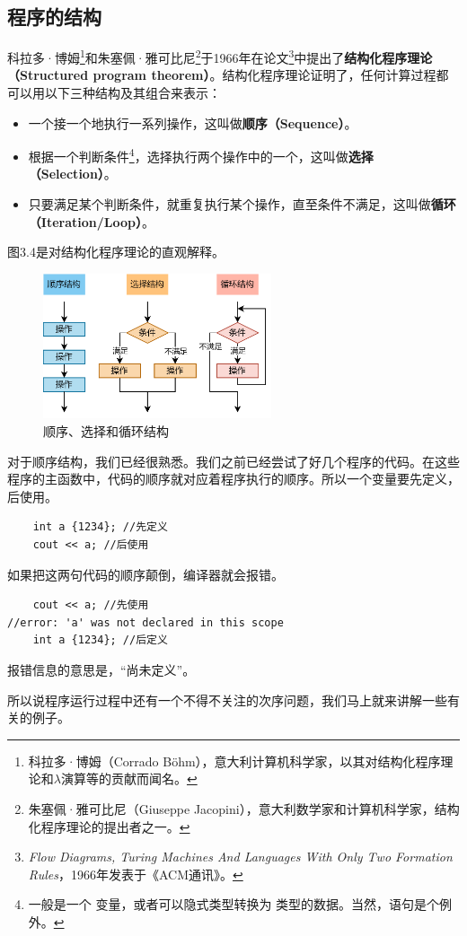 \subsection*{程序的结构}
科拉多·博姆\footnote{科拉多·博姆（Corrado Böhm），意大利计算机科学家，以其对结构化程序理论和$\!\lambda\!$演算等的贡献而闻名。}和朱塞佩·雅可比尼\footnote{朱塞佩·雅可比尼（Giuseppe Jacopini），意大利数学家和计算机科学家，结构化程序理论的提出者之一。}于1966年在论文\footnote{\textit{Flow Diagrams, Turing Machines And Languages With Only Two Formation Rules}，1966年发表于《ACM通讯》。}中提出了\textbf{结构化程序理论（Structured program theorem）}。结构化程序理论证明了，任何计算过程都可以用以下三种结构及其组合来表示：
\begin{itemize}
    \item 一个接一个地执行一系列操作，这叫做\textbf{顺序（Sequence）}。
    \item 根据一个判断条件\footnote{一般是一个 \lstinline@bool@ 变量，或者可以隐式类型转换为 \lstinline@bool@ 类型的数据。当然，\lstinline@switch@ 语句是个例外。}，选择执行两个操作中的一个，这叫做\textbf{选择（Selection）}。
    \item 只要满足某个判断条件，就重复执行某个操作，直至条件不满足，这叫做\textbf{循环（Iteration/Loop）}。
\end{itemize}
图3.4是对结构化程序理论的直观解释。\par
\begin{figure}[htbp]
    \centering
    \includegraphics[width=0.6\textwidth]{../images/generalized_parts/03_structured_program_theorem.drawio.png}
    \caption{顺序、选择和循环结构}
\end{figure}
对于顺序结构，我们已经很熟悉。我们之前已经尝试了好几个程序的代码。在这些程序的主函数中，代码的顺序就对应着程序执行的顺序。所以一个变量要先定义，后使用。
\begin{lstlisting}
    int a {1234}; //先定义
    cout << a; //后使用
\end{lstlisting}
如果把这两句代码的顺序颠倒，编译器就会报错。
\begin{lstlisting}
    cout << a; //先使用
//error: 'a' was not declared in this scope
    int a {1234}; //后定义
\end{lstlisting}
报错信息的意思是，``\lstinline@a@ 尚未定义''。\par
所以说程序运行过程中还有一个不得不关注的次序问题，我们马上就来讲解一些有关的例子。\par
